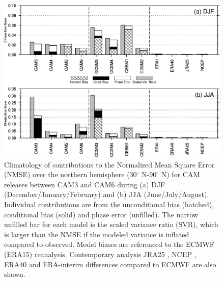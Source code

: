%
%
%
%
%


\clearpage
\begin{figure}[t]
  \begin{center}
    \includegraphics[width=1\textwidth,angle=0.]{./figs/f_CAM_CESM_NMSE_DJF_JJA.pdf}
 \end{center}
  \caption {Climatology of contributions to the Normalized Mean Square Error (NMSE) over the northern hemisphere (30$^\circ$ N-90$^\circ$ N) for CAM releases between CAM3 and CAM6 during (a) DJF (December/January/February) and (b) JJA (June/July/August). Individual contributions are from the unconditional bias (hatched), conditional bias (solid) and phase error (unfilled). The narrow unfilled bar for each model is the scaled variance ratio (SVR), which is larger than the NMSE if the modeled variance is inflated compared to observed. Model biases are referenced to the ECMWF (ERA15) reanalysis. Contemporary analysis JRA25 \citep{ONOGI2007}, NCEP \citep{Kanamitsu2002}, ERA40 \citep{Uppala2005} and ERA-interim \citep{Dee2011} differences compared to ECMWF \citep{Gibson1997} are also shown.} 
\label{f_CAM_CESM_NMSE_DJF_JJA}
\end{figure} 

